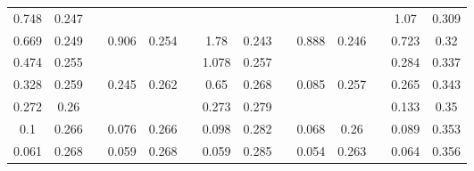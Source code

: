 \documentclass[%
 aip,
 amsmath,amssymb,
 reprint, floatfix%
]{revtex4-2}
\begin{document}
\begin{table}[]
\begin{tabular}{@{}cccccccccccccc@{}}
    0.748 & 0.247 &  &  &  &  &  &  &  &  &  &  & 1.07 & 0.309 \\
    0.669 & 0.249 &  & \multirow{2}{*}{0.906} & \multirow{2}{*}{0.254} &  & 1.78 & 0.243 &  & \multirow{2}{*}{0.888} & \multirow{2}{*}{0.246} &  & 0.723 & 0.32 \\
    0.474 & 0.255 &  &  &  &  & 1.078 & 0.257 &  &  &  &  & 0.284 & 0.337 \\
    0.328 & 0.259 &  & \multirow{2}{*}{0.245} & \multirow{2}{*}{0.262} &  & 0.65 & 0.268 &  & \multirow{2}{*}{0.085} & \multirow{2}{*}{0.257} &  & 0.265 & 0.343 \\
    0.272 & 0.26 &  &  &  &  & 0.273 & 0.279 &  &  &  &  & 0.133 & 0.35 \\
    0.1 & 0.266 &  & 0.076 & 0.266 &  & 0.098 & 0.282 &  & 0.068 & 0.26 &  & 0.089 & 0.353 \\
    0.061 & 0.268 &  & 0.059 & 0.268 &  & 0.059 & 0.285 &  & 0.054 & 0.263 &  & 0.064 & 0.356 \\ \bottomrule
    \end{tabular}
    \end{table}
    
\end{document}
